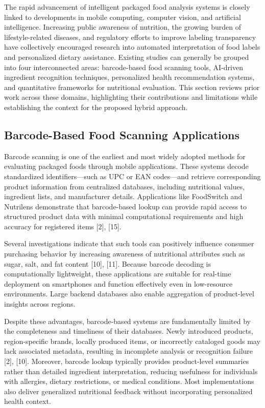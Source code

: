 \documentclass[conference]{IEEEtran}
\begin{document}
The rapid advancement of intelligent packaged food analysis systems is closely linked to developments in mobile computing, computer vision, and artificial intelligence. Increasing public awareness of nutrition, the growing burden of lifestyle-related diseases, and regulatory efforts to improve labeling transparency have collectively encouraged research into automated interpretation of food labels and personalized dietary assistance. Existing studies can generally be grouped into four interconnected areas: barcode-based food scanning tools, AI-driven ingredient recognition techniques, personalized health recommendation systems, and quantitative frameworks for nutritional evaluation. This section reviews prior work across these domains, highlighting their contributions and limitations while establishing the context for the proposed hybrid approach.

\subsection{Barcode-Based Food Scanning Applications}

Barcode scanning is one of the earliest and most widely adopted methods for evaluating packaged foods through mobile applications. These systems decode standardized identifiers—such as UPC or EAN codes—and retrieve corresponding product information from centralized databases, including nutritional values, ingredient lists, and manufacturer details. Applications like FoodSwitch and Nutrilens demonstrate that barcode-based lookup can provide rapid access to structured product data with minimal computational requirements and high accuracy for registered items [2], [15].

Several investigations indicate that such tools can positively influence consumer purchasing behavior by increasing awareness of nutritional attributes such as sugar, salt, and fat content [10], [11]. Because barcode decoding is computationally lightweight, these applications are suitable for real-time deployment on smartphones and function effectively even in low-resource environments. Large backend databases also enable aggregation of product-level insights across regions.

Despite these advantages, barcode-based systems are fundamentally limited by the completeness and timeliness of their databases. Newly introduced products, region-specific brands, locally produced items, or incorrectly cataloged goods may lack associated metadata, resulting in incomplete analysis or recognition failure [2], [10]. Moreover, barcode lookup typically provides product-level summaries rather than detailed ingredient interpretation, reducing usefulness for individuals with allergies, dietary restrictions, or medical conditions. Most implementations also deliver generalized nutritional feedback without incorporating personalized health context.
\end{document}
